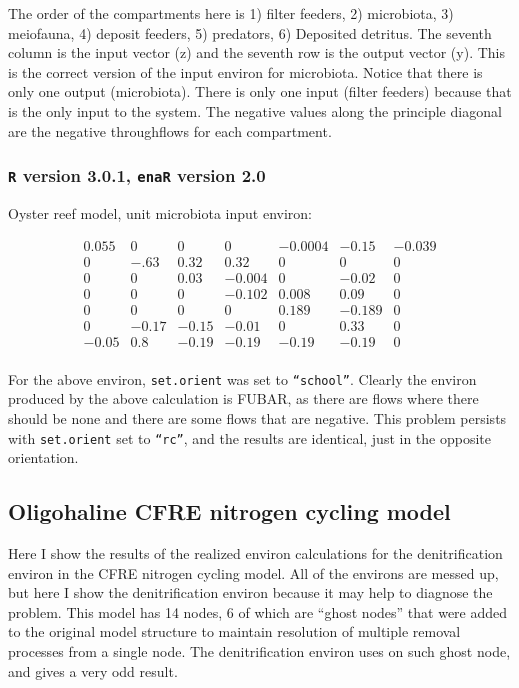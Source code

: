 \documentclass[]{article}
\begin{document}
The order of the compartments here is 1) filter feeders, 2)
microbiota, 3) meiofauna, 4) deposit feeders, 5) predators, 6)
Deposited detritus.  The seventh column is the input vector (z) and
the seventh row is the output vector (y).  This is the correct version
of the input environ for microbiota.  Notice that there is only one
output (microbiota).  There is only one input (filter feeders) because
that is the only input to the system.  The negative values along the
principle diagonal are the negative throughflows for each compartment.

\subsubsection{\texttt{R} version 3.0.1, \texttt{enaR} version 2.0}

Oyster reef model, unit microbiota input environ:  

\[
\begin{array}{ccccccc}
0.055 & 0 & 0 & 0 & -0.0004 & -0.15 & -0.039 \\
0 & -.63 & 0.32 & 0.32 & 0 & 0 & 0 \\
0 & 0 & 0.03 & -0.004 & 0 & -0.02 & 0 \\
0 & 0 & 0 & -0.102 & 0.008 & 0.09 & 0 \\
0 & 0 & 0 & 0 & 0.189 & -0.189 & 0 \\
0 & -0.17 & -0.15 & -0.01 & 0 & 0.33 & 0 \\
-0.05 & 0.8 & -0.19 & -0.19 & -0.19 & -0.19 & 0 \\
\end{array}
\]

For the above environ, \texttt{set.orient} was set to
\texttt{``school''}.  Clearly the environ produced by the above
calculation is FUBAR, as there are flows where there should be none
and there are some flows that are negative.  This problem persists
with \texttt{set.orient} set to \texttt{``rc''}, and the results are
identical, just in the opposite orientation.

\subsection{Oligohaline CFRE nitrogen cycling model}

Here I show the results of the realized environ calculations for the
denitrification environ in the CFRE nitrogen cycling model.  All of
the environs are messed up, but here I show the denitrification
environ because it may help to diagnose the problem.  This model has
14 nodes, 6 of which are ``ghost nodes'' that were added to the original
model structure to maintain resolution of multiple removal processes
from a single node.  The denitrification environ uses on such ghost
node, and gives a very odd result.
\end{document}
